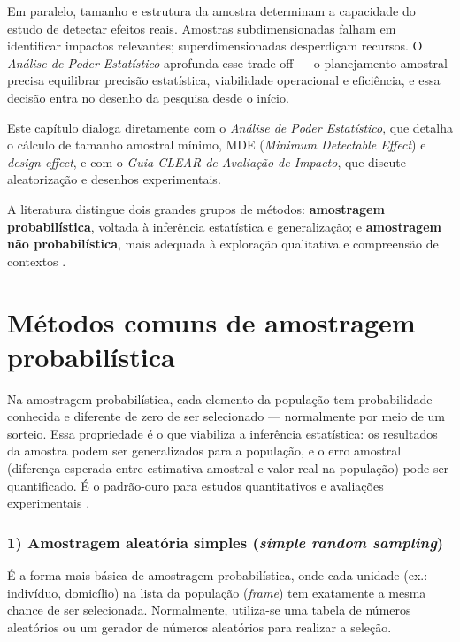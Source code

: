 \documentclass[12pt, a4paper, openany]{book}
\begin{document}
Em paralelo, tamanho e estrutura da amostra determinam a capacidade do estudo de detectar efeitos reais. Amostras subdimensionadas falham em identificar impactos relevantes; superdimensionadas desperdi\c{c}am recursos. O \textit{An\'alise de Poder Estat\'istico} \citep{fgvclear2025poder} aprofunda esse trade-off --- o planejamento amostral precisa equilibrar precis\~ao estat\'istica, viabilidade operacional e efici\^encia, e essa decis\~ao entra no desenho da pesquisa desde o in\'icio.

\begin{conexaobox}
Este cap\'itulo dialoga diretamente com o \textit{An\'alise de Poder Estat\'istico}, que detalha o c\'alculo de tamanho amostral m\'inimo, MDE (\textit{Minimum Detectable Effect}) e \textit{design effect}, e com o \textit{Guia CLEAR de Avalia\c{c}\~ao de Impacto}, que discute aleatoriza\c{c}\~ao e desenhos experimentais.
\end{conexaobox}

A literatura distingue dois grandes grupos de m\'etodos: \textbf{amostragem probabil\'istica}, voltada \`a infer\^encia estat\'istica e generaliza\c{c}\~ao; e \textbf{amostragem n\~ao probabil\'istica}, mais adequada \`a explora\c{c}\~ao qualitativa e compreens\~ao de contextos \citep{bryman2012social,neuman2014social}.

\section{M\'etodos comuns de amostragem probabil\'istica}

Na amostragem probabil\'istica, cada elemento da popula\c{c}\~ao tem probabilidade conhecida e diferente de zero de ser selecionado --- normalmente por meio de um sorteio. Essa propriedade \'e o que viabiliza a infer\^encia estat\'istica: os resultados da amostra podem ser generalizados para a popula\c{c}\~ao, e o erro amostral (diferen\c{c}a esperada entre estimativa amostral e valor real na popula\c{c}\~ao) pode ser quantificado. \'E o padr\~ao-ouro para estudos quantitativos e avalia\c{c}\~oes experimentais \citep{gertler2018impact}.

\subsubsection*{1) Amostragem aleat\'oria simples (\textit{simple random sampling})}

\'E a forma mais b\'asica de amostragem probabil\'istica, onde cada unidade (ex.: indiv\'iduo, domic\'ilio) na lista da popula\c{c}\~ao (\textit{frame}) tem exatamente a mesma chance de ser selecionada. Normalmente, utiliza-se uma tabela de n\'umeros aleat\'orios ou um gerador de n\'umeros aleat\'orios para realizar a sele\c{c}\~ao.
\end{document}
